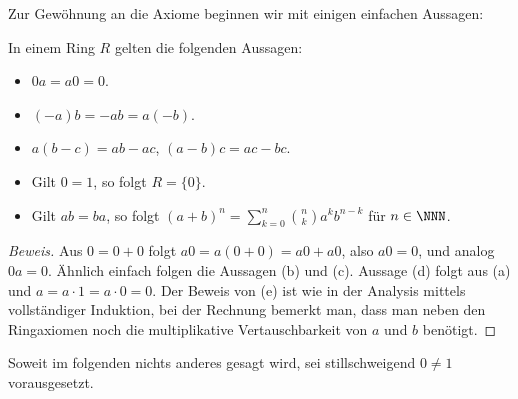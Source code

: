 \documentclass[12pt,a4paper,twoside]{article}
\begin{document}
Zur Gew\"ohnung an die Axiome beginnen wir mit einigen einfachen Aussagen:
\begin{Lemma}
  In einem Ring $R$ gelten die folgenden Aussagen:
  \begin{itemize}
  \item[(a)] $0a=a0=0$.
\item[(b)] $(-a)b=-ab=a(-b)$.
\item[(c)] $a(b-c)=ab-ac$, $(a-b)c=ac-bc$.
\item[(d)] Gilt $0=1$,  so folgt $R=\{0\}$.
\item[(e)] Gilt $ab=ba$, so folgt $(a+b)^n=\sum_{k=0}^n\binom{n}{k}a^kb^{n-k}$
  f\"ur $n\in\NNN$.
  \end{itemize}
\end{Lemma}
\begin{proof}[Beweis]
  Aus $0=0+0$ folgt $a0=a(0+0)=a0+a0$, also $a0=0$, und analog
  $0a=0$. \"Ahnlich einfach folgen die Aussagen (b) und (c). Aussage (d) folgt
  aus (a) und $a=a\cdot1=a\cdot0=0$. Der Beweis von (e) ist wie in der
  Analysis mittels vollst\"andiger Induktion, bei der Rechnung bemerkt man,
  dass man neben den Ringaxiomen noch die multiplikative Vertauschbarkeit von
  $a$ und $b$ ben\"otigt.
\end{proof}
Soweit im folgenden nichts anderes gesagt wird, sei stillschweigend $0\ne1$
vorausgesetzt.
\end{document}
